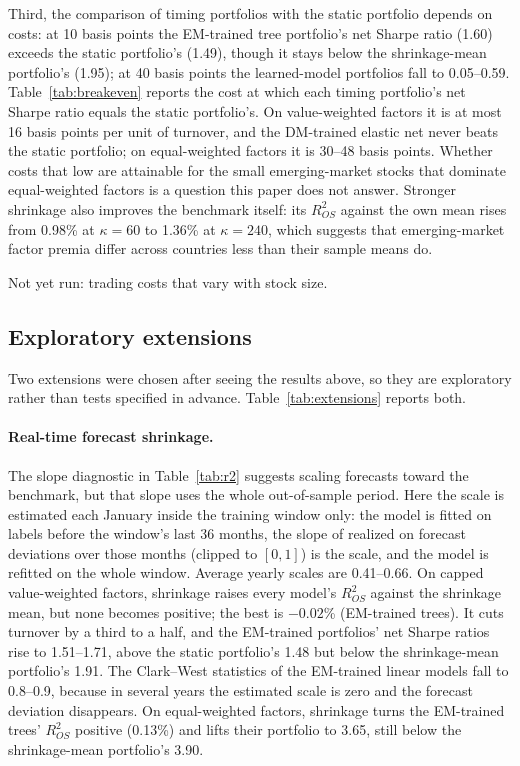 \documentclass[11pt]{article}
\begin{document}
Third, the comparison of timing portfolios with the static portfolio depends on costs: at 10 basis points the EM-trained tree portfolio's net Sharpe ratio (1.60) exceeds the static portfolio's (1.49), though it stays below the shrinkage-mean portfolio's (1.95); at 40 basis points the learned-model portfolios fall to 0.05--0.59. Table~\ref{tab:breakeven} reports the cost at which each timing portfolio's net Sharpe ratio equals the static portfolio's. On value-weighted factors it is at most 16 basis points per unit of turnover, and the DM-trained elastic net never beats the static portfolio; on equal-weighted factors it is 30--48 basis points. Whether costs that low are attainable for the small emerging-market stocks that dominate equal-weighted factors is a question this paper does not answer. Stronger shrinkage also improves the benchmark itself: its $R^2_{OS}$ against the own mean rises from 0.98\% at $\kappa = 60$ to 1.36\% at $\kappa = 240$, which suggests that emerging-market factor premia differ across countries less than their sample means do.

Not yet run: trading costs that vary with stock size.





\subsection{Exploratory extensions}
Two extensions were chosen after seeing the results above, so they are exploratory rather than tests specified in advance. Table~\ref{tab:extensions} reports both.

\paragraph{Real-time forecast shrinkage.} The slope diagnostic in Table~\ref{tab:r2} suggests scaling forecasts toward the benchmark, but that slope uses the whole out-of-sample period. Here the scale is estimated each January inside the training window only: the model is fitted on labels before the window's last 36 months, the slope of realized on forecast deviations over those months (clipped to $[0,1]$) is the scale, and the model is refitted on the whole window. Average yearly scales are 0.41--0.66. On capped value-weighted factors, shrinkage raises every model's $R^2_{OS}$ against the shrinkage mean, but none becomes positive; the best is $-0.02$\% (EM-trained trees). It cuts turnover by a third to a half, and the EM-trained portfolios' net Sharpe ratios rise to 1.51--1.71, above the static portfolio's 1.48 but below the shrinkage-mean portfolio's 1.91. The Clark--West statistics of the EM-trained linear models fall to 0.8--0.9, because in several years the estimated scale is zero and the forecast deviation disappears. On equal-weighted factors, shrinkage turns the EM-trained trees' $R^2_{OS}$ positive (0.13\%) and lifts their portfolio to 3.65, still below the shrinkage-mean portfolio's 3.90.
\end{document}

